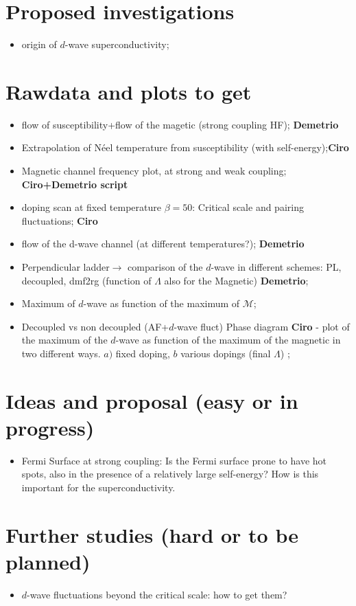 \documentclass[paper=a4, fontsize=11pt]{scrartcl} %
\numberwithin{equation}{section} %
\numberwithin{figure}{section} %
\numberwithin{table}{section} %
\begin{document}
\section{Proposed investigations} 
\begin{itemize}
\item origin of $d$-wave superconductivity;  
\end{itemize} 
\newpage
\section{Rawdata and plots to get} 
{\color{red} 
\begin{itemize}
\item flow of susceptibility+flow of the magetic (strong coupling HF); \textbf{Demetrio}
\item Extrapolation of N\' eel temperature from susceptibility (with self-energy);\textbf{Ciro}  
\item Magnetic channel frequency plot, at strong and weak coupling; \textbf{Ciro+Demetrio script} 
\item doping scan at fixed temperature $\beta=50$: Critical scale and pairing fluctuations; \textbf{Ciro} 
\item flow of the d-wave channel (at different temperatures?); \textbf{Demetrio}
\item Perpendicular ladder$\rightarrow$ comparison of the $d$-wave in different schemes: PL, decoupled, dmf2rg (function of $\Lambda$ also for the Magnetic) \textbf{Demetrio};
\item Maximum of $d$-wave as function of the maximum of $\mathcal{M}$;   
\item Decoupled vs non decoupled (AF+$d$-wave fluct) Phase diagram   \textbf{Ciro} - plot of the maximum of the $d$-wave as function of the maximum of the magnetic in two different ways. $a)$ fixed doping, $b$ various dopings (final $\Lambda$) ;
\end{itemize} 
 } 
 
 \section{Ideas and proposal (easy or in progress)}  
 
 \begin{itemize}
 \item Fermi Surface at strong coupling: Is the Fermi surface prone to have hot spots, also in the presence of a relatively large self-energy? How is this important for the superconductivity. 
 \end{itemize}
 \section{Further studies (hard or to be planned)}  
\begin{itemize}
\item $d$-wave fluctuations beyond the critical scale: how to get them?  
\end{itemize} 
\end{document}
